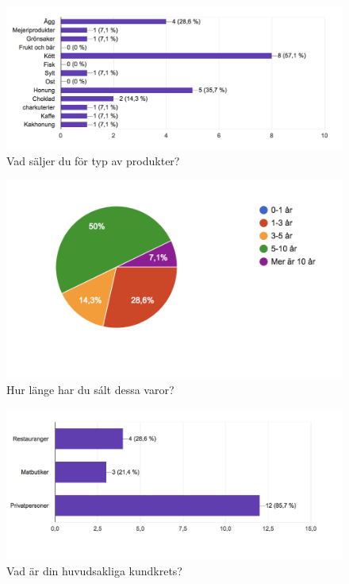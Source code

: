 \documentclass[10pt,a4paper,oneside]{article}
\begin{document}


\newpage


\begin{figure}
	\includegraphics[scale=0.6]{1.png}
	\caption{Vad s\"aljer du f\"or typ av produkter?}
\end{figure}

\begin{figure}
	\includegraphics[scale=0.6]{2.png}
	\caption{Hur l\"ange har du s\'alt dessa varor?}
\end{figure}

\begin{figure}
	\includegraphics[scale=0.6]{3.png}
	\caption{Vad \"ar din huvudsakliga kundkrets?}
\end{figure}
\end{document}
